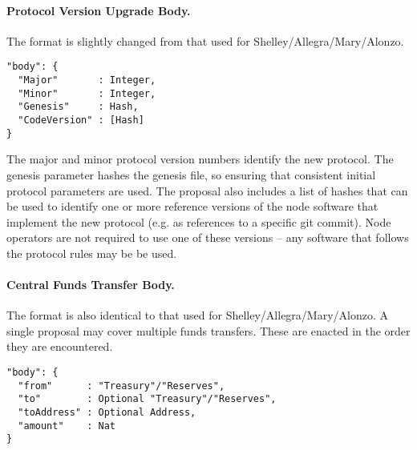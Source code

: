 \paragraph{Protocol Version Upgrade Body.}  The format is slightly changed from that used for Shelley/Allegra/Mary/Alonzo.


\begin{verbatim}
"body": {
  "Major"       : Integer,
  "Minor"       : Integer,
  "Genesis"     : Hash,
  "CodeVersion" : [Hash]
}
\end{verbatim}

The major and minor protocol version numbers identify the new protocol.  The genesis parameter hashes the genesis file, so ensuring that consistent initial protocol parameters are used.
The proposal also includes a list of hashes that can be used to identify one or more reference versions of the node software that implement the new protocol (e.g. as references to a specific git commit).
Node operators are not required to use one of these versions -- any software that follows the protocol rules may be be used.


\paragraph{Central Funds Transfer Body.}  The format is also identical to that used for Shelley/Allegra/Mary/Alonzo.
A single proposal may cover multiple funds transfers.  These are enacted in the order they are encountered.

\begin{verbatim}
"body": {
  "from"      : "Treasury"/"Reserves",
  "to"        : Optional "Treasury"/"Reserves",
  "toAddress" : Optional Address,
  "amount"    : Nat
}
\end{verbatim}


